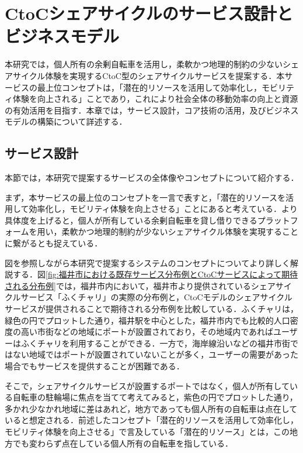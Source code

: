 \section{CtoCシェアサイクルのサービス設計とビジネスモデル}
  \label{sec:CtoCシェアサイクルのサービス設計とビジネスモデル}
    \par 本研究では，個人所有の余剰自転車を活用し，柔軟かつ地理的制約の少ないシェアサイクル体験を実現するCtoC型のシェアサイクルサービスを提案する．本サービスの最上位コンセプトは，「潜在的リソースを活用して効率化し，モビリティ体験を向上される」ことであり，これにより社会全体の移動効率の向上と資源の有効活用を目指す．本章では，サービス設計，コア技術の活用，及びビジネスモデルの構築について詳述する．
      
  \subsection{サービス設計}
    \label{sec:サービス設計}
      \par 本節では，本研究で提案するサービスの全体像やコンセプトについて紹介する．
      \par まず，本サービスの最上位のコンセプトを一言で表すと，「潜在的リソースを活用して効率化し，モビリティ体験を向上させる」ことにあると考えている．より具体度を上げると，個人が所有している余剰自転車を貸し借りできるプラットフォームを用い，柔軟かつ地理的制約が少ないシェアサイクル体験を実現することに繋がるとも捉えている．
      \par 図を参照しながら本研究で提案するシステムのコンセプトについてより詳しく解説する．図\ref{fig:福井市における既存サービス分布例とCtoCサービスによって期待される分布例}では，福井市内において，福井市より提供されているシェアサイクルサービス「ふくチャリ」の実際の分布例と，CtoCモデルのシェアサイクルサービスが提供されることで期待される分布例を比較している．ふくチャリは，緑色の円でプロットした通り，福井駅を中心とした，福井市内でも比較的人口密度の高い市街などの地域にポートが設置されており，その地域内であればユーザーはふくチャリを利用することができる．一方で，海岸線沿いなどの福井市街ではない地域ではポートが設置されていないことが多く，ユーザーの需要があった場合でもサービスを提供することが困難である．
      \par そこで，シェアサイクルサービスが設置するポートではなく，個人が所有している自転車の駐輪場に焦点を当てて考えてみると，紫色の円でプロットした通り，多かれ少なかれ地域に差はあれど，地方であっても個人所有の自転車は点在していると想定される．前述したコンセプト「潜在的リソースを活用して効率化し，モビリティ体験を向上させる」で言及している「潜在的リソース」とは，この地方でも変わらず点在している個人所有の自転車を指している．

